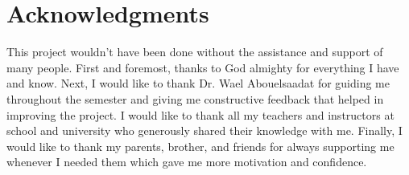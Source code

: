\chapter*{Acknowledgments}
\label{chap:ack}
This project wouldn't have been done without the assistance and support of many people. First and foremost, thanks to God almighty for everything I have and know. Next, I would like to thank Dr. Wael Abouelsaadat for guiding me throughout the semester and giving me constructive feedback that helped in improving the project. I would like to thank all my teachers and instructors at school and university who generously shared their knowledge with me. Finally, I would like to thank my parents, brother, and friends for always supporting me whenever I needed them which gave me more motivation and confidence.
